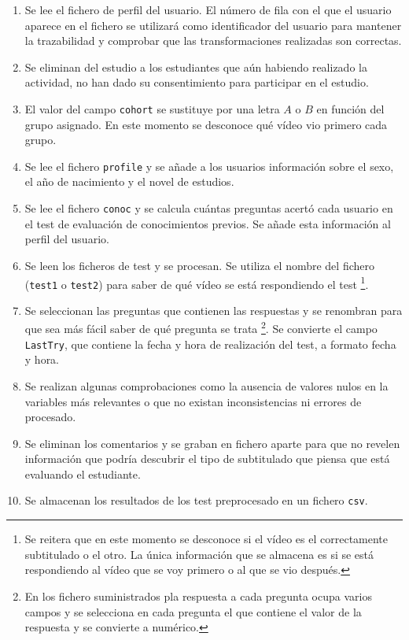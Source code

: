 \documentclass[
  12pt,
  a4paper,
  extrafontsizes,
  onecolumn,
  openright]{memoir}
\newlength{\rf}
\begin{document}
\begin{enumerate}
\def\labelenumi{\arabic{enumi}.}
\item
  Se lee el fichero de perfil del usuario. El número de fila con el que
  el usuario aparece en el fichero se utilizará como identificador del
  usuario para mantener la trazabilidad y comprobar que las
  transformaciones realizadas son correctas.
\item
  Se eliminan del estudio a los estudiantes que aún habiendo realizado
  la actividad, no han dado su consentimiento para participar en el
  estudio.
\item
  El valor del campo \texttt{cohort} se sustituye por una letra \(A\) o
  \(B\) en función del grupo asignado. En este momento se desconoce qué
  vídeo vio primero cada grupo.
\item
  Se lee el fichero \texttt{profile} y se añade a los usuarios
  información sobre el sexo, el año de nacimiento y el novel de
  estudios.
\item
  Se lee el fichero \texttt{conoc} y se calcula cuántas preguntas acertó
  cada usuario en el test de evaluación de conocimientos previos. Se
  añade esta información al perfil del usuario.
\item
  Se leen los ficheros de test y se procesan. Se utiliza el nombre del
  fichero (\texttt{test1} o \texttt{test2}) para saber de qué vídeo se
  está respondiendo el test \footnote{Se reitera que en este momento se
    desconoce si el vídeo es el correctamente subtitulado o el otro. La
    única información que se almacena es si se está respondiendo al
    vídeo que se voy primero o al que se vio después.}.
\item
  Se seleccionan las preguntas que contienen las respuestas y se
  renombran para que sea más fácil saber de qué pregunta se trata
  \footnote{En los fichero suministrados pla respuesta a cada pregunta
    ocupa varios campos y se selecciona en cada pregunta el que contiene
    el valor de la respuesta y se convierte a numérico.}. Se convierte
  el campo \texttt{LastTry}, que contiene la fecha y hora de realización
  del test, a formato fecha y hora.
\item
  Se realizan algunas comprobaciones como la ausencia de valores nulos
  en la variables más relevantes o que no existan inconsistencias ni
  errores de procesado.
\item
  Se eliminan los comentarios y se graban en fichero aparte para que no
  revelen información que podría descubrir el tipo de subtitulado que
  piensa que está evaluando el estudiante.
\item
  Se almacenan los resultados de los test preprocesado en un fichero
  \texttt{csv}.
\end{enumerate}
\end{document}
